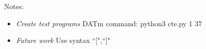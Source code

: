 {Notes}:
\begin{itemize}[noitemsep]
\item \textit{Create test programs} DATm command: python3 cte.py 1  37
\item \textit{Future work} Use syntax ``[",``]"
\end{itemize}

